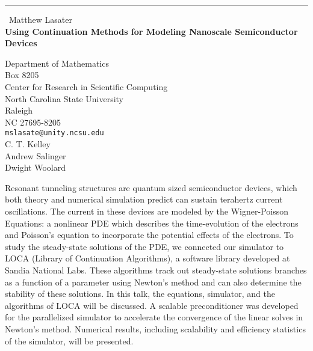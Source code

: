 \documentclass{report}
\begin{document}
\begin{center}
\rule{6in}{1pt} \
{\large Matthew Lasater \\
{\bf Using Continuation Methods for Modeling Nanoscale Semiconductor Devices}}

Department of Mathematics \\ Box 8205 \\ Center for Research in Scientific Computing \\ North Carolina State University \\ Raleigh \\ NC  27695-8205
\\
{\tt mslasate@unity.ncsu.edu}\\
C. T. Kelley\\
Andrew Salinger\\
	Dwight Woolard\end{center}

Resonant tunneling structures are quantum sized semiconductor devices,
which both theory and numerical simulation predict can sustain terahertz
current oscillations. The current in these devices are modeled by the
Wigner-Poisson Equations: a nonlinear PDE which describes the
time-evolution of the electrons and Poisson's equation to incorporate the
potential effects of the electrons. To study the steady-state solutions
of the PDE, we connected our simulator to LOCA (Library of Continuation
Algorithms), a software library developed at Sandia National Labs. These
algorithms track out steady-state solutions branches as a function of a
parameter using Newton's method and can also determine the stability of
these solutions.
In this talk, the equations, simulator, and the algorithms of LOCA will
be discussed. A scalable preconditioner was developed for the
parallelized simulator to accelerate the convergence of the linear solves
in Newton's method. Numerical results, including scalability and
efficiency statistics of the simulator,
will be presented.
\end{document}
